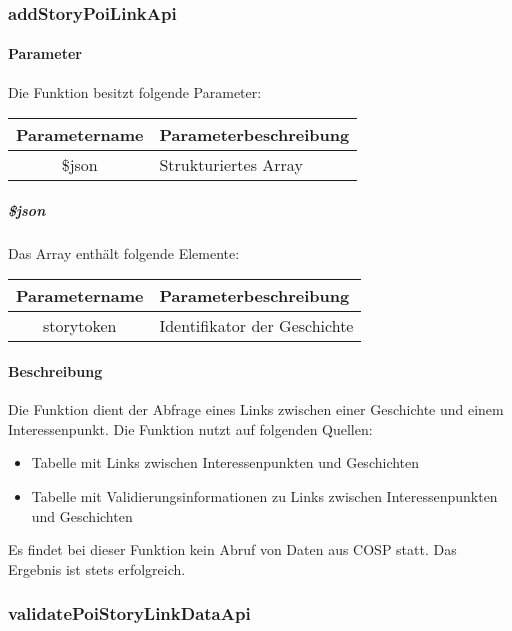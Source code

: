 \subsubsection{addStoryPoiLinkApi}
\paragraph{Parameter} Die Funktion besitzt folgende Parameter:
\begin{table}[H]
	\begin{tabular}{|c|p{11cm}|}
		\hline
		\textbf{Parametername} & \textbf{Parameterbeschreibung} \\ \hline
		\$json & Strukturiertes Array \\ \hline
	\end{tabular}
\end{table}
\subparagraph{\$json}Das Array enthält folgende Elemente:
\begin{table}[H]
	\begin{tabular}{|c|p{11cm}|}
		\hline
		\textbf{Parametername} & \textbf{Parameterbeschreibung} \\ \hline
		storytoken & Identifikator der Geschichte \\ \hline
	\end{tabular}
\end{table}
\paragraph{Beschreibung} Die Funktion dient der Abfrage eines Links zwischen einer Geschichte und einem Interessenpunkt. Die Funktion nutzt auf folgenden Quellen:
\begin{itemize}
	\item Tabelle mit Links zwischen Interessenpunkten und Geschichten
	\item Tabelle mit Validierungsinformationen zu Links zwischen Interessenpunkten und Geschichten
\end{itemize}
Es findet bei dieser Funktion kein Abruf von Daten aus {\glqq COSP\grqq} statt. Das Ergebnis ist stets erfolgreich.
\subsubsection{validatePoiStoryLinkDataApi}
